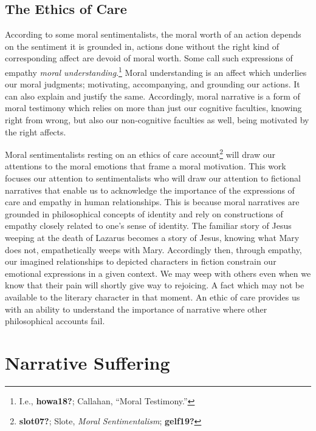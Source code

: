 \documentclass[phdthesis,12pt,final]{wuthesis}
\theoremstyle{definition}
\theoremstyle{definition}
\theoremstyle{definition}
\theoremstyle{definition}
\theoremstyle{remark}
\begin{document}
\subsection*{The Ethics of Care}\label{the-ethics-of-care}

According to some moral sentimentalists, the moral worth of an action depends on the sentiment it is grounded in, actions done without the right kind of corresponding affect are devoid of moral worth. Some call such expressions of empathy \emph{moral understanding}.\footnote{I.e., \textbf{howa18?}; Callahan, {``Moral {Testimony}.''}} Moral understanding is an affect which underlies our moral judgments; motivating, accompanying, and grounding our actions. It can also explain and justify the same. Accordingly, moral narrative is a form of moral testimony which relies on more than just our cognitive faculties, knowing right from wrong, but also our non-cognitive faculties as well, being motivated by the right affects.

Moral sentimentalists resting on an ethics of care account\footnote{\textbf{slot07?}; Slote, \emph{Moral {Sentimentalism}}; \textbf{gelf19?}} will draw our attentions to the moral emotions that frame a moral motivation. This work focuses our attention to sentimentalists who will draw our attention to fictional narratives that enable us to acknowledge the importance of the expressions of care and empathy in human relationships. This is because moral narratives are grounded in philosophical concepts of identity and rely on constructions of empathy closely related to one's sense of identity. The familiar story of Jesus weeping at the death of Lazarus becomes a story of Jesus, knowing what Mary does not, empathetically weeps with Mary. Accordingly then, through empathy, our imagined relationships to depicted characters in fiction constrain our emotional expressions in a given context. We may weep with others even when we know that their pain will shortly give way to rejoicing. A fact which may not be available to the literary character in that moment. An ethic of care provides us with an ability to understand the importance of narrative where other philosophical accounts fail.

\section{Narrative Suffering}\label{narrative-suffering}
\end{document}
